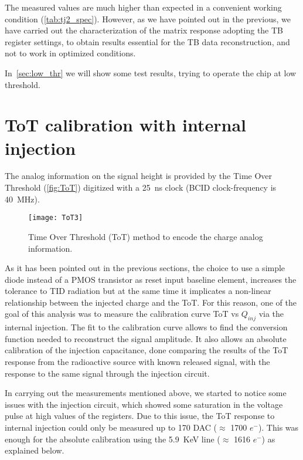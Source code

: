 The measured values are much higher than expected in a convenient working condition (\autoref{tab:tj2_spec}). However, as we have pointed out in the previous, we have carried out the characterization of the matrix response adopting the TB register settings, to obtain results essential for the TB data reconstruction, and not to work in optimized conditions.


In~\autoref{sec:low_thr} we will show some test results, trying to operate the chip at low threshold.




\section{ToT calibration with internal injection}


The analog information on the signal height is provided by the Time Over Threshold (\autoref{fig:ToT}) digitized with a \SI{25}{ns} clock (BCID clock-frequency is \SI{40}{MHz}). 

\begin{figure}
\centering
\texttt{[image: ToT3]}
\caption{Time Over Threshold (ToT) method to encode the charge analog information.}
\label{fig:ToT}
\end{figure}

As it has been pointed out in the previous sections, the choice to use a simple diode instead of a PMOS transistor as reset input baseline element, increases the tolerance to TID radiation but at the same time it implicates a non-linear relationship between the injected charge and the ToT. For this reason, one of the goal of this analysis was to measure the calibration curve ToT vs $Q_{inj}$ via the internal injection. The fit to the calibration curve allows to find the conversion function needed to reconstruct the signal amplitude. It also allows an absolute calibration of the injection capacitance, done comparing the results of the ToT response from the radioactive source with known released signal, with the response to the same signal through the injection circuit.



In carrying out the measurements mentioned above, we started to notice some issues with the injection circuit, which showed some saturation in the voltage pulse at high values of the registers. Due to this issue, the ToT response to internal injection could only be measured up to 170 DAC ($\approx$ 1700 $e^{-}$). This was enough for the absolute calibration using the  \SI{5.9}{KeV} line ($\approx$ 1616 $e^{-}$) as explained below.\\

